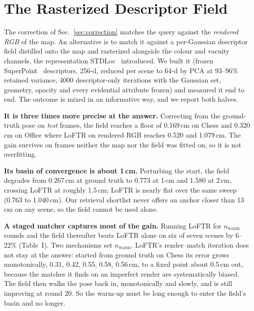 \documentclass[journal]{IEEEtran}
\begin{document}
\section{The Rasterized Descriptor Field}
\label{sec:locfeat}
The correction of Sec.~\ref{sec:correction} matches the query against the
\emph{rendered RGB} of the map. An alternative is to match it against a
per-Gaussian descriptor field distilled onto the map and rasterized alongside
the colour and vacuity channels, the representation STDLoc~\cite{stdloc}
introduced. We built it (frozen SuperPoint~\cite{superpoint} descriptors,
256-d, reduced per scene to 64-d by PCA at 93--96\% retained variance,
4000 descriptor-only iterations with the Gaussian set, geometry, opacity and
every evidential attribute frozen) and measured it end to end. The outcome is
mixed in an informative way, and we report both halves.

\textbf{It is three times more precise at the answer.} Correcting from the
ground-truth pose on \emph{test} frames, the field reaches a floor of
0.169\,cm on Chess and 0.320\,cm on Office where LoFTR on rendered RGB reaches
0.520 and 1.079\,cm. The gain survives on frames neither the map nor the field
was fitted on, so it is not overfitting.

\textbf{Its basin of convergence is about 1\,cm.} Perturbing the start,
the field degrades from 0.267\,cm at ground truth to 0.773 at 1\,cm and 1.580
at 2\,cm, crossing LoFTR at roughly 1.5\,cm; LoFTR is nearly flat over the
same sweep (0.763 to 1.040\,cm). Our retrieval shortlist never offers an
anchor closer than 13\,cm on any scene, so the field cannot be used alone.

\textbf{A staged matcher captures most of the gain.} Running LoFTR for
$n_\mathrm{warm}$ rounds and the field thereafter beats LoFTR alone on six of
seven scenes by 6--22\% (Table~I). Two mechanisms set $n_\mathrm{warm}$.
LoFTR's render--match iteration does not stay at the answer: started from
ground truth on Chess its error grows monotonically, 0.31, 0.42, 0.55, 0.58,
0.56\,cm, to a fixed point about 0.5\,cm out, because the matches it finds on
an imperfect render are systematically biased. The field then walks the pose
back in, monotonically and slowly, and is still improving at round 20. So the
warm-up must be long enough to enter the field's basin and no longer.
\end{document}
